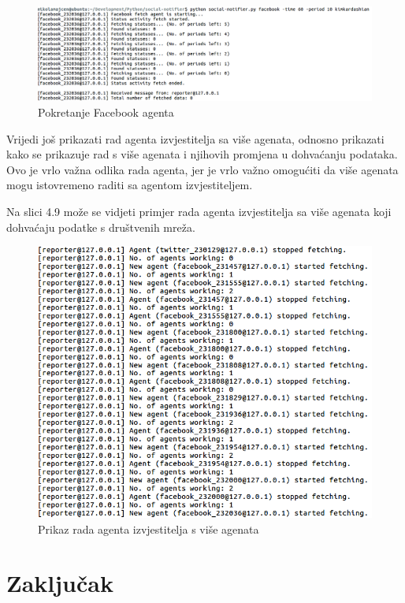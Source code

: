 \documentclass[a4paper,12pt]{foi}
\begin{document}
\begin{figure}[h]
\includegraphics[width=\linewidth, frame]{08-facebook-fetch}
	\caption{Pokretanje Facebook agenta}
\end{figure}

Vrijedi još prikazati rad agenta izvjestitelja sa više agenata, odnosno prikazati kako se prikazuje rad s više agenata i njihovih promjena u dohvaćanju podataka. Ovo je vrlo važna odlika rada agenta, jer je vrlo važno omogućiti da više agenata mogu istovremeno raditi sa agentom izvjestiteljem. 

Na slici 4.9 može se vidjeti primjer rada agenta izvjestitelja sa više agenata koji dohvaćaju podatke s društvenih mreža.

\begin{figure}[h]
\includegraphics[width=\linewidth, frame]{09-reporter-multiconnect}
	\caption{Prikaz rada agenta izvjestitelja s više agenata}
\end{figure}


\chapter{Zaključak}
\end{document}

